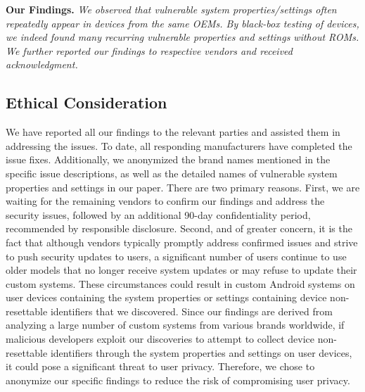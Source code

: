 \noindent \textbf{Our Findings.}
\textit{We observed that vulnerable system properties/settings often repeatedly appear in devices from the same OEMs. 
By black-box testing of \dynamicmodels devices, we indeed found many recurring vulnerable properties and settings without ROMs.
We further reported our findings to respective vendors and received acknowledgment.}




\subsection{Ethical Consideration}
We have reported all our findings to the relevant parties and assisted them in addressing the issues. 
To date, all responding manufacturers have completed the issue fixes.
Additionally, we anonymized the brand names mentioned in the specific issue descriptions, as well as the detailed names of vulnerable system properties and settings in our paper.
There are two primary reasons. 
First, we are waiting for the remaining vendors to confirm our findings and address the security issues, followed by an additional 90-day confidentiality period, recommended by responsible disclosure. 
Second, and of greater concern, it is the fact that although vendors typically promptly address confirmed issues and strive to push security updates to users, a significant number of users continue to use older models that no longer receive system updates or may refuse to update their custom systems. 
These circumstances could result in custom Android systems on user devices containing the system properties or settings containing device non-resettable identifiers that we discovered.
Since our findings are derived from analyzing a large number of custom systems from various brands worldwide, if malicious developers exploit our discoveries to attempt to collect device non-resettable identifiers through the system properties and settings on user devices, it could pose a significant threat to user privacy.
Therefore, we chose to anonymize our specific findings to reduce the risk of compromising user privacy.